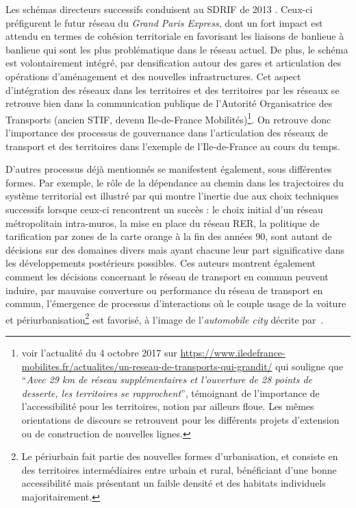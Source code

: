 Les schémas directeurs successifs conduisent au SDRIF de 2013 \cite{sdrif2013}. Ceux-ci préfigurent le futur réseau du \emph{Grand Paris Express}, dont un fort impact est attendu en termes de cohésion territoriale en favorisant les liaisons de banlieue à banlieue qui sont les plus problématique dans le réseau actuel. De plus, le schéma est volontairement intégré, par densification autour des gares et articulation des opérations d'aménagement et des nouvelles infrastructures. Cet aspect d'intégration des réseaux dans les territoires et des territoires par les réseaux se retrouve bien dans la communication publique de l'Autorité Organisatrice des Transports (ancien STIF, devenu Ile-de-France Mobilités)\footnote{voir l'actualité du 4 octobre 2017 sur \url{https://www.iledefrance-mobilites.fr/actualites/un-reseau-de-transports-qui-grandit/} qui souligne que ``\textit{Avec 29 km de réseau supplémentaires et l’ouverture de 28 points de desserte, les territoires se rapprochent}'', témoignant de l'importance de l'accessibilité pour les territoires, notion par ailleurs floue. Les mêmes orientations de discours se retrouvent pour les différents projets d'extension ou de construction de nouvelles lignes.}. On retrouve donc l'importance des processus de gouvernance dans l'articulation des réseaux de transport et des territoires dans l'exemple de l'Ile-de-France au cours du temps.


D'autres processus déjà mentionnés se manifestent également, sous différentes formes. Par exemple, le rôle de la dépendance au chemin dans les trajectoires du système territorial est illustré par \cite{larroque2002paris} qui montre l'inertie due aux choix techniques successifs lorsque ceux-ci rencontrent un succès : le choix initial d'un réseau métropolitain intra-muros, la mise en place du réseau RER, la politique de tarification par zones de la carte orange à la fin des années 90, sont autant de décisions sur des domaines divers mais ayant chacune leur part significative dans les développements postérieurs possibles. Ces auteurs montrent également comment les décisions concernant le réseau de transport en commun peuvent induire, par mauvaise couverture ou performance du réseau de transport en commun, l'émergence de processus d'interactions où le couple usage de la voiture et périurbanisation\footnote{Le périurbain fait partie des nouvelles formes d'urbanisation, et consiste en des territoires intermédiaires entre urbain et rural, bénéficiant d'une bonne accessibilité mais présentant un faible densité et des habitats individuels majoritairement.} est favorisé, à l'image de l'\emph{automobile city} décrite par~\cite{newman1996land}. 



